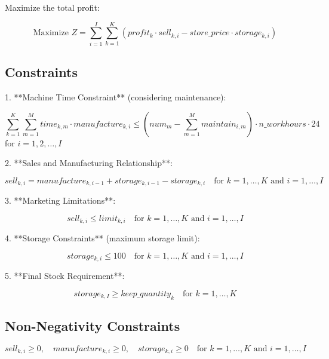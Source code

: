\documentclass{article}
\begin{document}
Maximize the total profit:

\[
\text{Maximize } Z = \sum_{i=1}^{I} \sum_{k=1}^{K} \left( profit_k \cdot sell_{k,i} - store\_price \cdot storage_{k,i} \right)
\]

\subsection*{Constraints}

1. **Machine Time Constraint** (considering maintenance):

\[
\sum_{k=1}^{K} \sum_{m=1}^{M} time_{k,m} \cdot manufacture_{k,i} \leq (num_m - \sum_{m=1}^{M} maintain_{i,m}) \cdot n\_workhours \cdot 24
\]
for $i = 1, 2, \ldots, I$

2. **Sales and Manufacturing Relationship**:

\[
sell_{k,i} = manufacture_{k,i-1} + storage_{k,i-1} - storage_{k,i} \quad \text{for } k = 1, \ldots, K \text{ and } i = 1, \ldots, I
\]

3. **Marketing Limitations**:

\[
sell_{k,i} \leq limit_{k,i} \quad \text{for } k = 1, \ldots, K \text{ and } i = 1, \ldots, I
\]

4. **Storage Constraints** (maximum storage limit):

\[
storage_{k,i} \leq 100 \quad \text{for } k = 1, \ldots, K \text{ and } i = 1, \ldots, I
\]

5. **Final Stock Requirement**:

\[
storage_{k,I} \geq keep\_quantity_k \quad \text{for } k = 1, \ldots, K
\]

\subsection*{Non-Negativity Constraints}

\[
sell_{k,i} \geq 0, \quad manufacture_{k,i} \geq 0, \quad storage_{k,i} \geq 0 \quad \text{for } k = 1, \ldots, K \text{ and } i = 1, \ldots, I
\]
\end{document}

